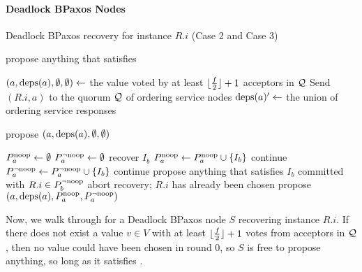 \paragraph{Deadlock BPaxos Nodes}
\begin{algorithm}[ht]
  \caption{Deadlock BPaxos recovery for instance $R.i$ (Case 2 and Case 3)}%
  \begin{algorithmic}[1]
      \State propose anything that satisfies 
    \EndIf{}

    \State
    \State $(a, \text{deps}(a), \emptyset, \emptyset) \gets$ the value
             voted by at least $\lfloor\frac{f}{2}\rfloor + 1$ acceptors in $\mathcal{Q}$
    \State Send $(R.i, a)$ to the quorum $\mathcal{Q}$ of ordering service nodes
    \State $\text{deps}(a)' \gets$ the union of ordering service responses

    \State
      \State propose $(a, \text{deps}(a), \emptyset, \emptyset)$
    \EndIf{}

    \State
    \State $P^{\text{noop}}_{a} \gets \emptyset$
    \State $P^{\lnot \text{noop}}_{a} \gets \emptyset$
        \State recover $I_b$
      \EndIf
      \State $P^{\text{noop}}_{a} \gets P^{\text{noop}}_{a} \cup \{I_b\}$
        \State continue
      \EndIf{}
        \State $P^{\lnot \text{noop}}_{a} \gets P^{\lnot \text{noop}}_{a} \cup \{I_b\}$
        \State continue
        \State propose anything that satisfies 
      \Else{}
        \State $I_b$ committed with $R.i \in P^{\lnot \text{noop}}_{b}$
        \State abort recovery; $R.i$ has already been chosen
      \EndIf{}
    \EndFor{}
    \State propose $(a, \text{deps}(a), P^{\text{noop}}_{a}, P^{\lnot \text{noop}}_{a})$
  \end{algorithmic}
\end{algorithm}

Now, we walk through  for a Deadlock BPaxos node $S$
recovering instance $R.i$. If there does not exist a value $v \in V$ with at
least $\lfloor\frac{f}{2}\rfloor + 1$ votes from acceptors in $\mathcal{Q}$, then no value
could have been chosen in round $0$, so $S$ is free to propose anything, so
long as it satisfies .

